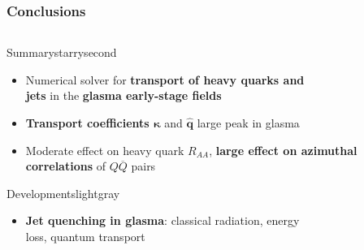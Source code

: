 \documentclass[aspectratio=169,11pt,usenames,dvipsnames]{beamer}
\begin{document}
\begin{frame}
    \frametitle{Conclusions}
    \vspace{-13pt}

    \begin{center}
        \begin{columns}
                \vspace{-10pt}
                \begin{center}
                \begin{custombox2}{Summary}{starrysecond}
                    \footnotesize
                    \begin{varwidth}{\textwidth}
                    \begin{itemize}\itemsep0em 
                        \item Numerical solver for {\bfseries\color{starrysecond}transport of heavy quarks and} \\ {\bfseries\color{starrysecond}jets} in the {\bfseries\color{starrysecond}glasma early-stage fields}
                        \item {\bfseries\color{starrysecond}Transport coefficients $\boldsymbol{\kappa}$} and {\bfseries\color{starrysecond}$\boldsymbol{\hat{q}}$} large peak in glasma
                        \item Moderate effect on heavy quark $R_{AA}$, {\bfseries\color{starrysecond}large effect on azimuthal correlations} of $Q\overline{Q}$ pairs
                    \end{itemize}
                    \end{varwidth}
                \end{custombox2}
                \vspace{10pt}
                \begin{custombox2}{Developments}{lightgray}
                    \footnotesize
                    \begin{varwidth}{\textwidth}
                    \begin{itemize}\itemsep0em 
                        \item {\bfseries\color{custompink} Jet quenching in glasma}: classical radiation, energy \\ loss, quantum transport

\end{itemize}
\end{varwidth}
\end{custombox2}
\end{center}
\end{columns}
\end{center}
\end{frame}
\end{document}
